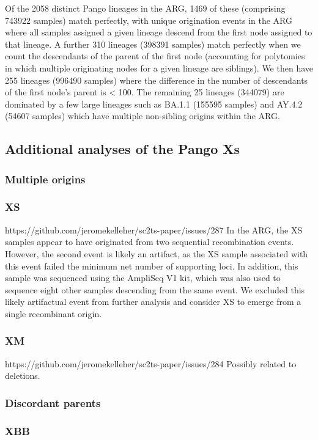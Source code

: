 \documentclass[12pt,letterpaper]{article}
\begin{document}
Of the 2058 distinct Pango lineages in the ARG, 
1469 of these (comprising 743922 samples) match perfectly, 
with unique origination events in the ARG 
where all samples assigned a given lineage descend from the first node assigned to that lineage. 
A further 310 lineages (398391 samples) match perfectly 
when we count the descendants of the parent of the first node 
(accounting for polytomies in which multiple originating nodes for a given lineage are siblings). 
We then have 255 lineages (996490 samples) 
where the difference in the number of descendants of the first node's parent is < 100. 
The remaining 25 lineages (344079) are dominated by a few large lineages such as BA.1.1 (155595 samples) and AY.4.2 (54607 samples) 
which have multiple non-sibling origins within the ARG.

\subsection*{Additional analyses of the Pango Xs}
\subsubsection*{Multiple origins}
\subsubsection*{XS}
https://github.com/jeromekelleher/sc2ts-paper/issues/287
In the ARG, the XS samples appear to have originated from two sequential recombination events. 
However, the second event is likely an artifact, 
as the XS sample associated with this event failed the minimum net number of supporting loci. 
In addition, this sample was sequenced using the AmpliSeq V1 kit, 
which was also used to sequence eight other samples descending from the same event. 
We excluded this likely artifactual event from further analysis and 
consider XS to emerge from a single recombinant origin.

\subsubsection*{XM}
https://github.com/jeromekelleher/sc2ts-paper/issues/284
Possibly related to deletions.

\subsubsection*{Discordant parents}
\subsubsection*{XBB}
\end{document}
